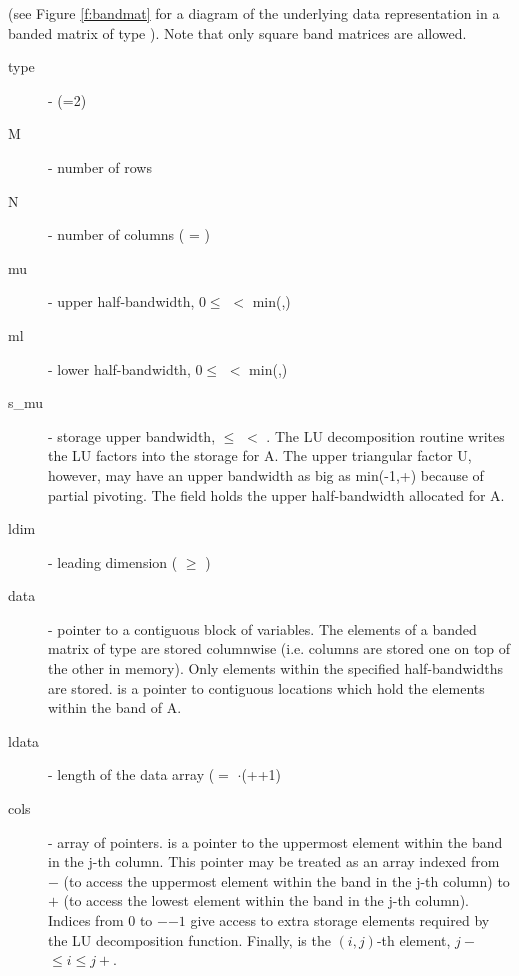 (see Figure \ref{f:bandmat} for a diagram of the underlying data representation
in a banded matrix of type ). Note that only square band matrices are 
allowed.
\begin{description}
  \item[type]  -  (=2)
  \item[M]  - number of rows
  \item[N]  - number of columns ( = )
  \item[mu]    - upper half-bandwidth, $0 \le$  $<$ min(,)
  \item[ml]    - lower half-bandwidth, $0 \le$  $<$ min(,)
  \item[s\_mu]  - storage upper bandwidth,  $\le$  $<$ .
    The LU decomposition routine writes the LU factors into the storage 
    for A. The upper triangular factor U, however, may have 
    an upper bandwidth as big as min(-1,+) because of 
    partial pivoting. The  field holds the upper half-bandwidth allocated for A.
  \item[ldim]  - leading dimension ( $\ge$ )
  \item[data]  - pointer to a contiguous block of  variables.
    The elements of a banded matrix of type  are      
    stored columnwise (i.e. columns are stored one on top  
    of the other in memory). Only elements within the      
    specified half-bandwidths are stored.     
     is a pointer to  contiguous locations   
    which hold the elements within the band of A.  
  \item[ldata] - length of the data array ($=$ $\cdot$(++1)
  \item[cols]  - array of pointers.  is a pointer to the uppermost element 
    within the band  in the j-th column. This pointer may be treated as   
    an array indexed from $-$ (to access the uppermost element within the 
    band in the j-th column) to $+$ (to access the lowest element     
    within the band in the j-th column). Indices from $0$ to $-$$-1$ give 
    access to extra storage elements required by the LU decomposition function.
    Finally,  is the $(i,j)$-th element, $j-$ $\le i \le j+$. 
\end{description}
